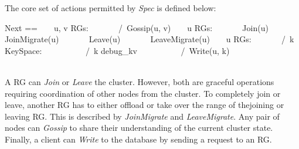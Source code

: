The core set of actions permitted by \textit{Spec} is defined below:\\
\begin{tla}
Next ==
    \/ \E u, v \in RGs:
        /\ Gossip(u, v)
    \/ \E u \in RGs:
        \/ Join(u) 
        \/ JoinMigrate(u)
        \/ Leave(u)
        \/ LeaveMigrate(u)
    \/ \E u \in RGs:
        /\ \E k \in KeySpace:
            /\ k \notin debug_kv
            /\ Write(u, k)
\end{tla}
\begin{tlatex}
%
%
%
%
%
%
%
%
%
%
%
%
\end{tlatex}
\\

A RG can \textit{Join} or \textit{Leave} the cluster. However, both are
graceful operations requiring coordination of other nodes from the cluster. To
completely join or leave, another RG has to either offload or take over the
range of thejoining or leaving RG. This is described by \textit{JoinMigrate}
and \textit{LeaveMigrate}. Any pair of nodes can \textit{Gossip} to share their
understanding of the current cluster state. Finally, a client can
\textit{Write} to the database by sending a request to an RG.\\

